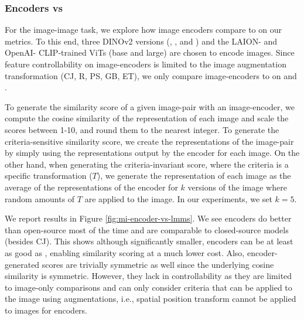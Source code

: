 
\vspace{-2mm}
\subsubsection{Encoders vs \modelss{}}    
\label{sec:ecoders_vs_decoders}

For the image-image task, we explore how image encoders compare to \modelss{} on our metrics. To this end, three DINOv2 versions (\dinoBase, \dinoSmall, and \dinoLarge) and the LAION- and OpenAI- CLIP-trained ViTs (base and large) are chosen to encode images. Since feature controllability on image-encoders is limited to the image augmentation transformation (CJ, R, PS, GB, ET), we only compare image-encoders to \modelss{} on \mmscorecoco{} and \mmscorein.

To generate the similarity score of a given image-pair with an image-encoder, we compute the cosine similarity of the representation of each image and scale the scores between 1-10, and round them to the nearest integer. To generate the criteria-sensitive similarity score, we create the representations of the image-pair by simply using the representations output by the encoder for each image. On the other hand, when generating the criteria-invariant score, where the criteria is a specific transformation ($T$), we generate the representation of each image as the average of the representations of the encoder for $k$ versions of the image where random amounts of $T$ are applied to the image. In our experiments, we set $k=5$.

We report results in Figure \ref{fig:mi-encoder-vs-lmms}. We see encoders do better than open-source \modelss{} most of the time and are comparable to closed-source models (besides CJ). This shows although significantly smaller, encoders can be at least as good as \modelss{}, enabling similarity scoring at a much lower cost. Also, encoder-generated scores are trivially symmetric as well since the underlying cosine similarity is symmetric. However, they lack in controllability as they are limited to image-only comparisons and can only consider criteria that can be applied to the image using augmentations, i.e., spatial position transform cannot be applied to images for encoders.

